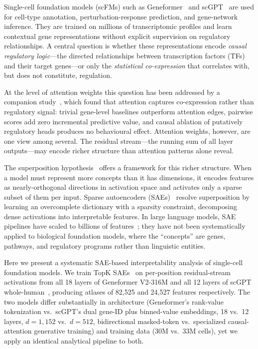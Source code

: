 Single-cell foundation models (scFMs) such as Geneformer~\cite{theodoris2023transfer} and
scGPT~\cite{cui2024scgpt} are used for cell-type annotation, perturbation-response prediction, and
gene-network inference. They are trained on millions of transcriptomic profiles and learn
contextual gene representations without explicit supervision on regulatory relationships. A central
question is whether these representations encode \emph{causal regulatory logic}---the directed
relationships between transcription factors (TFs) and their target genes---or only the
\emph{statistical co-expression} that correlates with, but does not constitute, regulation.

At the level of attention weights this question has been addressed by a companion
study~\cite{kendiukhov2025systematic}, which found that attention captures co-expression rather
than regulatory signal: trivial gene-level baselines outperform attention edges, pairwise scores
add zero incremental predictive value, and causal ablation of putatively regulatory heads produces
no behavioural effect. Attention weights, however, are one view among several. The residual
stream---the running sum of all layer outputs---may encode richer structure than attention patterns
alone reveal.

The superposition hypothesis~\cite{elhage2022superposition} offers a framework for this richer
structure. When a model must represent more concepts than it has dimensions, it encodes features as
nearly-orthogonal directions in activation space and activates only a sparse subset of them per
input. Sparse autoencoders
(SAEs)~\cite{olshausen1997sparse,sharkey2022taking,cunningham2023sparse,bricken2023monosemanticity}
resolve superposition by learning an overcomplete dictionary with a sparsity constraint,
decomposing dense activations into interpretable features. In large language models, SAE pipelines
have scaled to billions of features~\cite{gao2024scaling,templeton2024scaling}; they have not been
systematically applied to biological foundation models, where the ``concepts'' are genes, pathways,
and regulatory programs rather than linguistic entities.

Here we present a systematic SAE-based interpretability analysis of single-cell foundation models.
We train TopK SAEs~\cite{makhzani2013ksparse} on per-position residual-stream activations from all
18 layers of Geneformer V2-316M and all 12 layers of scGPT whole-human~\cite{cui2024scgpt},
producing atlases of 82,525 and 24,527 features respectively. The two models differ substantially
in architecture (Geneformer's rank-value tokenization vs.\ scGPT's dual gene-ID plus binned-value
embeddings, 18 vs.\ 12 layers, $d{=}1{,}152$ vs.\ $d{=}512$, bidirectional masked-token vs.\
specialized causal-attention generative training) and training data (30M vs.\ 33M cells), yet we
apply an identical analytical pipeline to both.

